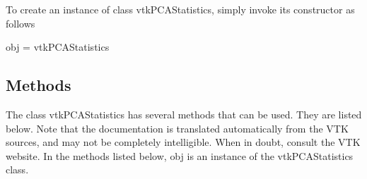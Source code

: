 To create an instance of class vtk\-P\-C\-A\-Statistics, simply invoke its constructor as follows \begin{DoxyVerb}  obj = vtkPCAStatistics
\end{DoxyVerb}
 \hypertarget{vtkwidgets_vtkxyplotwidget_Methods}{}\subsection{Methods}\label{vtkwidgets_vtkxyplotwidget_Methods}
The class vtk\-P\-C\-A\-Statistics has several methods that can be used. They are listed below. Note that the documentation is translated automatically from the V\-T\-K sources, and may not be completely intelligible. When in doubt, consult the V\-T\-K website. In the methods listed below, {\ttfamily obj} is an instance of the vtk\-P\-C\-A\-Statistics class. 
